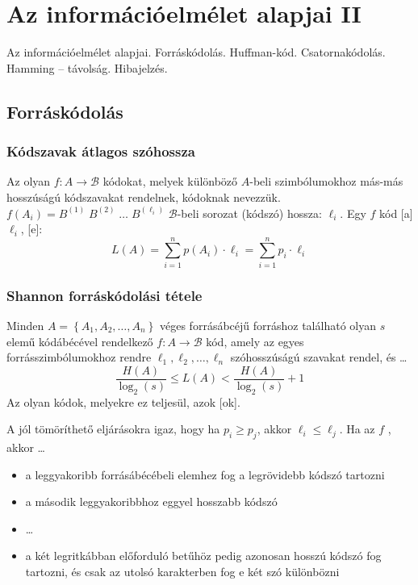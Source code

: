 \documentclass[../main.tex]{subfiles}
\begin{document}
\section{Az információelmélet alapjai II}

\begin{fulltheorem}
	Az információelmélet alapjai. Forráskódolás. Huffman-kód. Csatornakódolás.
	Hamming -- távolság. Hibajelzés.
\end{fulltheorem}

\subsection{Forráskódolás}

\subsubsection*{Kódszavak átlagos szóhossza}

Az olyan $f: A \rightarrow \mathcal{B}$ kódokat, melyek különböző $A$-beli
szimbólumokhoz más-más hosszúságú kódszavakat rendelnek,
 kódoknak nevezzük.
$f(A_i) = B^{(1)} \; B^{(2)} \; \dots \; B^{(\ell_i)}$
$\mathcal{B}$-beli sorozat (kódszó) hossza: ${\ell_i}$.
Egy $f$ kód [a] $\ell_i$,
[e]:
\[
	L(A) = \sum_{i=1}^n p(A_i) \cdot \ell_i =
	\sum_{i=1}^n p_i \cdot\ell_i
\]

\subsubsection*{Shannon forráskódolási tétele}

Minden $A = \left\{ A_1, A_2, \dots , A_n \right\}$
véges forrásábcéjű forráshoz található olyan $s$ elemű
kódábécével rendelkező $f: A \rightarrow \mathcal{B}$
kód, amely az egyes forrásszimbólumokhoz rendre
$\ell_1, \ell_2, \dots, \ell_n$ szóhosszúságú szavakat
rendel, és \dots
\[
	\frac{H(A)}{\log_2(s)}
	\leq L(A)
	< \frac{H(A)}{\log_2(s)} + 1
\]
Az olyan kódok, melyekre ez teljesül, azok [ok].

A jól tömöríthető eljárásokra igaz, hogy ha $p_i \geq p_j$,
akkor $\ell_i \leq \ell_j$. Ha az $f$  ,
akkor \dots
\begin{itemize}
	\item a leggyakoribb forrásábécébeli elemhez
	      fog a legrövidebb kódszó tartozni

	\item a második leggyakoribbhoz eggyel hosszabb kódszó

	\item \dots

	\item a két legritkábban előforduló betűhöz
	      pedig azonosan hosszú kódszó fog tartozni,
	      és csak az utolsó karakterben fog e két szó különbözni
\end{itemize}
\end{document}
